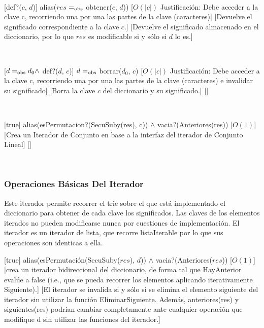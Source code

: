 ~

[def?($c$, $d$)]
{alias($res$ $=_{\mathrm{obs}}$ obtener($c$, $d$))}
[$O(|c|)$ Justificación: Debe acceder a la clave c, recorriendo una por una las partes de la clave (caracteres)]
[Devuelve el significado correspondiente a la clave $c$.]
[Devuelve el significado almacenado en el diccionario, por lo que $res$ es modificable si y sólo si $d$ lo es.]

~

[$ d =_{\mathrm{obs}} d_0 \land $ def?($d$, $c$)]
{$ d =_{\mathrm{obs}}$ borrar($d_0$, $c$)}
[$O(|c|)$ Justificación: Debe acceder a la clave c, recorriendo una por una las partes de la clave (caracteres) e invalidar su significado]
[Borra la clave $c$ del diccionario y su significado.]
[]

~

[true]
{alias(esPermutacion?(SecuSuby(res), c)) $\land$ vacia?(Anteriores(res))}
[$O(1)$]
[Crea un Iterador de Conjunto en base a la interfaz del iterador de Conjunto Lineal]
[]

~
\subsubsection{Operaciones Básicas Del Iterador}

Este iterador permite recorrer el trie sobre el que est\'{a} implementado el diccionario para obtener de cada clave los significados. Las claves de los elementos iterados no
pueden modificarse nunca por cuestiones de implementación. El iterador es un iterador de lista, que recorre listaIterable por lo que sus operaciones son identicas a ella.

[true]
{alias(esPermutación(SecuSuby($res$), $d$)) $\land$ vacia?(Anteriores($res$))}
[$O(1)$]
[crea un iterador bidireccional del diccionario, de forma tal que HayAnterior evalúe a false (i.e.,
que se pueda recorrer los elementos aplicando iterativamente Siguiente).]
[El iterador se invalida si y sólo si se elimina el elemento siguiente del iterador sin utilizar la función
EliminarSiguiente. Además, anteriores(res) y siguientes(res) podrían cambiar completamente ante cualquier
operación que modifique d sin utilizar las funciones del iterador.]

~

